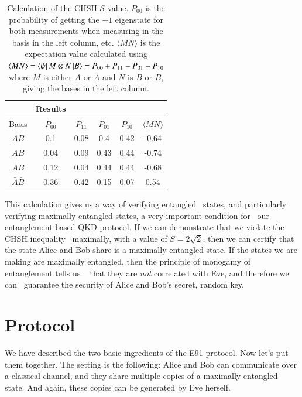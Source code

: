 \begin{table}[t]
    \centering
    \begin{tabular}{c|c|c|c|c|c}
          & Results \\\hline
         Basis & $P_{00}$ & $P_{11}$ & $P_{01}$ & $P_{10}$ & $\langle MN \rangle$ \\
         \hline
        $AB$ & 0.1 & 0.08 & 0.4 & 0.42 & -0.64 \\
         $A\bar{B}$ & 0.04 & 0.09 & 0.43 & 0.44 & -0.74 \\
        $\bar{A}B$ & 0.12 & 0.04 & 0.44 & 0.44 & -0.68 \\
         $\bar{A}\bar{B}$ & 0.36 & 0.42 & 0.15 & 0.07 & 0.54 \\
\hline
\end{tabular}
    \caption{Calculation of the CHSH $\mathcal{S}$ value. $P_{00}$ is the probability of getting the $+1$ eigenstate for both measurements when measuring in the basis in the left column, etc.  $\langle MN \rangle$ is the expectation value calculated using $\langle MN \rangle = \left\langle \psi \right| M\otimes N\left| B \right\rangle = P_{00} + P_{11} - P_{01} - P_{10}$ where $M$ is either $A$ or $\bar{A}$ and $N$ is $B$ or $\bar{B}$,  giving the bases in the left column.}
    \label{tab:chsh-calculation}
\end{table}


This calculation gives us a way of verifying entangled 
states, and particularly verifying maximally
entangled states, a very important condition for 
our entanglement-based QKD protocol. If we can
demonstrate that we violate the CHSH inequality 
maximally, with a value of 
$S = 2\sqrt{2}$, then we can certify that
the state Alice and Bob share is a maximally
entangled state. If the states we are making are maximally entangled, then the principle of monogamy of entanglement tells us  
that they are \emph{not} correlated with Eve, and therefore we can 
guarantee the security of Alice and Bob's secret, random key.

\section{Protocol}


We have described the two basic ingredients of the E91 protocol. Now let's put them together. The setting is the following: Alice and Bob can communicate over a classical channel, and they share multiple copies of a maximally entangled state. And again, these copies can be generated by Eve herself.

